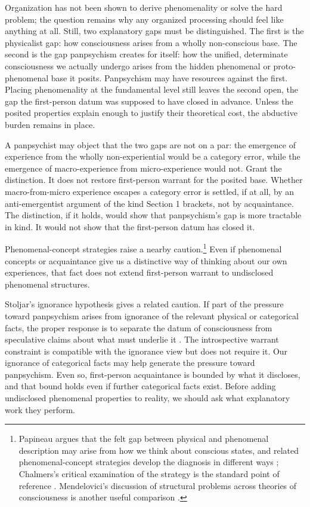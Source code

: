 Organization has not been shown to derive phenomenality or solve the hard problem; the question remains why any organized processing should feel like anything at all. Still, two explanatory gaps must be distinguished. The first is the physicalist gap: how consciousness arises from a wholly non-conscious base. The second is the gap panpsychism creates for itself: how the unified, determinate consciousness we actually undergo arises from the hidden phenomenal or proto-phenomenal base it posits. Panpsychism may have resources against the first. Placing phenomenality at the fundamental level still leaves the second open, the gap the first-person datum was supposed to have closed in advance. Unless the posited properties explain enough to justify their theoretical cost, the abductive burden remains in place.

A panpsychist may object that the two gaps are not on a par: the emergence of experience from the wholly non-experiential would be a category error, while the emergence of macro-experience from micro-experience would not. Grant the distinction. It does not restore first-person warrant for the posited base. Whether macro-from-micro experience escapes a category error is settled, if at all, by an anti-emergentist argument of the kind Section 1 brackets, not by acquaintance. The distinction, if it holds, would show that panpsychism's gap is more tractable in kind. It would not show that the first-person datum has closed it.

Phenomenal-concept strategies raise a nearby caution.\footnote{Papineau argues that the felt gap between physical and phenomenal description may arise from how we think about conscious states, and related phenomenal-concept strategies develop the diagnosis in different ways \citep{papineau2002,loar1990,balog2012pcs,carruthersVeillet2007}; Chalmers's critical examination of the strategy is the standard point of reference \citep{chalmers2006pcs}. Mendelovici's discussion of structural problems across theories of consciousness is another useful comparison \citep{mendelovici2019}.} Even if phenomenal concepts or acquaintance give us a distinctive way of thinking about our own experiences, that fact does not extend first-person warrant to undisclosed phenomenal structures.

Stoljar's ignorance hypothesis gives a related caution. If part of the pressure toward panpsychism arises from ignorance of the relevant physical or categorical facts, the proper response is to separate the datum of consciousness from speculative claims about what must underlie it \citep{stoljar2006ignorance}. The introspective warrant constraint is compatible with the ignorance view but does not require it. Our ignorance of categorical facts may help generate the pressure toward panpsychism. Even so, first-person acquaintance is bounded by what it discloses, and that bound holds even if further categorical facts exist. Before adding undisclosed phenomenal properties to reality, we should ask what explanatory work they perform.

